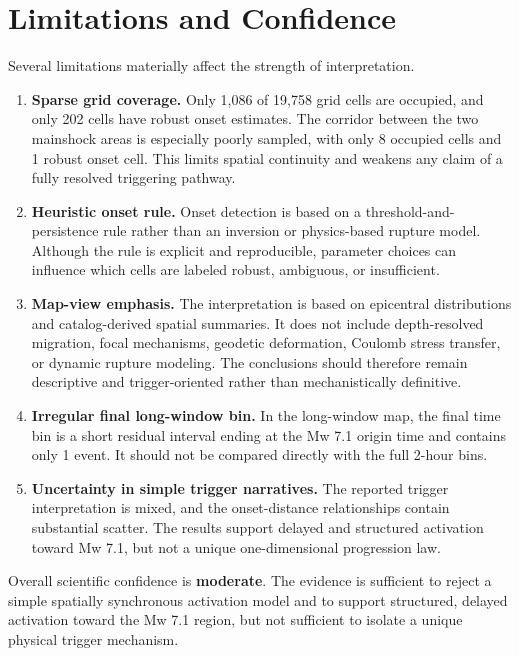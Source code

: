 \documentclass[11pt]{article}
\begin{document}
\section{Limitations and Confidence}
Several limitations materially affect the strength of interpretation.

\begin{enumerate}[leftmargin=1.5em]
    \item \textbf{Sparse grid coverage.} Only 1,086 of 19,758 grid cells are occupied, and only 202 cells have robust onset estimates. The corridor between the two mainshock areas is especially poorly sampled, with only 8 occupied cells and 1 robust onset cell. This limits spatial continuity and weakens any claim of a fully resolved triggering pathway.

    \item \textbf{Heuristic onset rule.} Onset detection is based on a threshold-and-persistence rule rather than an inversion or physics-based rupture model. Although the rule is explicit and reproducible, parameter choices can influence which cells are labeled robust, ambiguous, or insufficient.

    \item \textbf{Map-view emphasis.} The interpretation is based on epicentral distributions and catalog-derived spatial summaries. It does not include depth-resolved migration, focal mechanisms, geodetic deformation, Coulomb stress transfer, or dynamic rupture modeling. The conclusions should therefore remain descriptive and trigger-oriented rather than mechanistically definitive.

    \item \textbf{Irregular final long-window bin.} In the long-window map, the final time bin is a short residual interval ending at the Mw 7.1 origin time and contains only 1 event. It should not be compared directly with the full 2-hour bins.

    \item \textbf{Uncertainty in simple trigger narratives.} The reported trigger interpretation is mixed, and the onset-distance relationships contain substantial scatter. The results support delayed and structured activation toward Mw 7.1, but not a unique one-dimensional progression law.
\end{enumerate}

Overall scientific confidence is \textbf{moderate}. The evidence is sufficient to reject a simple spatially synchronous activation model and to support structured, delayed activation toward the Mw 7.1 region, but not sufficient to isolate a unique physical trigger mechanism.
\end{document}
